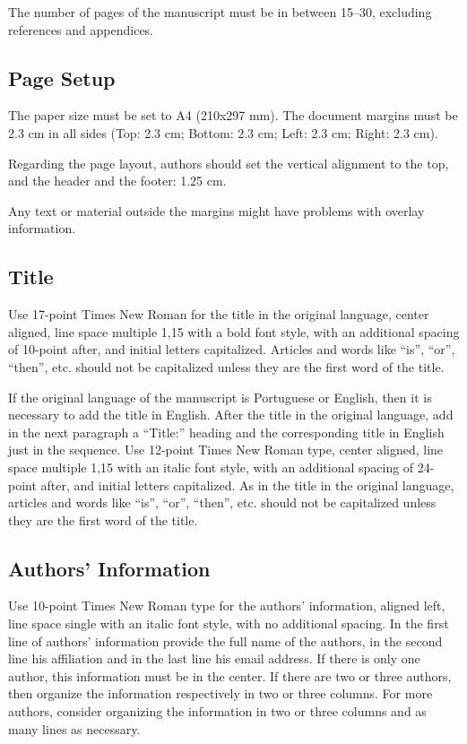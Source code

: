 \documentclass[english, spanish, brazilian]{RBIEarticle} %
\begin{document}
The number of pages of the manuscript must be in between 15--30, excluding references and appendices.


\subsection{Page Setup}
The paper size must be set to A4 (210x297 mm). The document margins must be 2.3 cm in all sides (Top: 2.3 cm; Bottom: 2.3 cm; Left: 2.3 cm; Right: 2.3 cm).

Regarding the page layout, authors should set the vertical alignment to the top, and the header and the footer: 1.25 cm.

Any text or material outside the margins might have problems with overlay information.


\subsection{Title}
Use 17-point Times New Roman for the title in the original language, center aligned, line space multiple 1,15 with a bold font style, with an additional spacing of 10-point after, and initial letters capitalized. Articles and words like ``is'', ``or'', ``then'', etc. should not be capitalized unless they are the first word of the title.

If the original language of the manuscript is Portuguese or English, then it is necessary to add the title in English. After the title in the original language, add in the next paragraph a “Title:” heading and the corresponding title in English just in the sequence. Use 12-point Times New Roman type, center aligned, line space multiple 1,15 with an italic font style, with an additional spacing of 24-point after, and initial letters capitalized. As in the title in the original language, articles and words like ``is'', ``or'', ``then'', etc. should not be capitalized unless they are the first word of the title.


\subsection{Authors’ Information}
Use 10-point Times New Roman type for the authors’ information, aligned left, line space single with an italic font style, with no additional spacing. In the first line of authors’ information provide the full name of the authors, in the second line his affiliation and in the last line his email address. If there is only one author, this information must be in the center. If there are two or three authors, then organize the information respectively in two or three columns. For more authors, consider organizing the information in two or three columns and as many lines as necessary.
\end{document}
